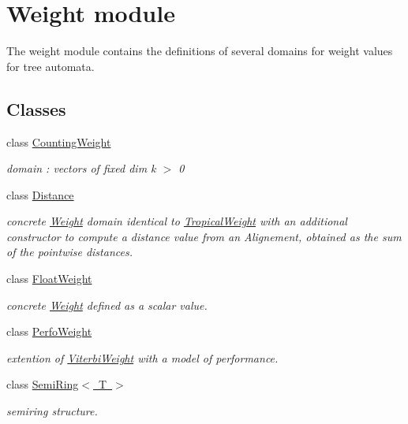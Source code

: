 \hypertarget{group__weight}{}\section{Weight module}
\label{group__weight}


The {\ttfamily weight} module contains the definitions of several domains for weight values for tree automata.  


\subsection*{Classes}
\begin{DoxyCompactItemize}
\item 
class \mbox{\hyperlink{classCountingWeight}{Counting\+Weight}}
\begin{DoxyCompactList}\small\item\em domain \+: vectors of fixed dim k $>$ 0 \end{DoxyCompactList}\item 
class \mbox{\hyperlink{classDistance}{Distance}}
\begin{DoxyCompactList}\small\item\em concrete \mbox{\hyperlink{classWeight}{Weight}} domain identical to \mbox{\hyperlink{classTropicalWeight}{Tropical\+Weight}} with an additional constructor to compute a distance value from an Alignement, obtained as the sum of the pointwise distances. \end{DoxyCompactList}\item 
class \mbox{\hyperlink{classFloatWeight}{Float\+Weight}}
\begin{DoxyCompactList}\small\item\em concrete \mbox{\hyperlink{classWeight}{Weight}} defined as a scalar value. \end{DoxyCompactList}\item 
class \mbox{\hyperlink{classPerfoWeight}{Perfo\+Weight}}
\begin{DoxyCompactList}\small\item\em extention of \mbox{\hyperlink{classViterbiWeight}{Viterbi\+Weight}} with a model of performance. \end{DoxyCompactList}\item 
class \mbox{\hyperlink{classSemiRing}{Semi\+Ring$<$ T $>$}}
\begin{DoxyCompactList}\small\item\em semiring structure. \end{DoxyCompactList}\item 

\end{DoxyCompactItemize}
